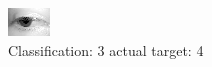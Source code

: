 \begin{figure}[h!]
\begin{center}
\includegraphics[width=0.60\columnwidth]{figures/ID2563_class_3_target_4.png}
\end{center}
\caption{ Classification: 3 actual target: 4}
\label{fig:ID2563_class_3_target_4}
\end{figure}
